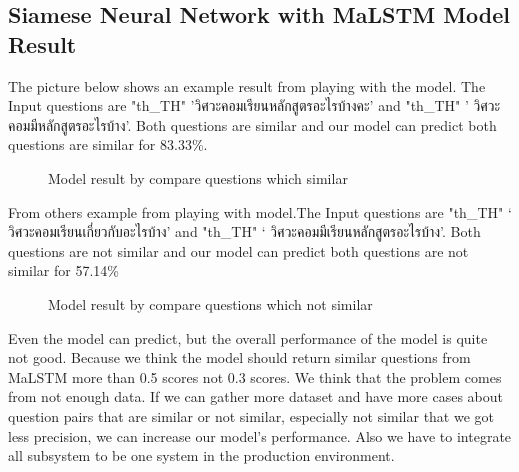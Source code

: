 \documentclass[12pt,oneside,openright,a4paper]{cpe-english-project}
\begin{document}
\subsection{Siamese Neural Network with MaLSTM Model Result}

The picture below shows an example result from playing with the model. The Input questions are
{
\XeTeXlinebreaklocale "th_TH"	
\thaifont 
'วิศวะคอมเรียนหลักสูตรอะไรบ้างคะ' }
and
{
\XeTeXlinebreaklocale "th_TH"	
\thaifont 
 ' วิศวะคอมมีหลักสูตรอะไรบ้าง'. 
}Both questions are similar and our model can predict both questions are similar for 83.33\%.

\begin{figure}[!h]\centering
{}
\caption{Model result by compare questions which similar}\label{fig:Model result by compare questions which similar}
\end{figure}

From others example from playing with model.The Input questions are
{
\XeTeXlinebreaklocale "th_TH"	
\thaifont 
 ‘ วิศวะคอมเรียนเกี่ยวกับอะไรบ้าง’ }and 
{
\XeTeXlinebreaklocale "th_TH"	
\thaifont ‘ วิศวะคอมมีเรียนหลักสูตรอะไรบ้าง’.}
 Both questions are not similar and our model can predict both questions are not similar for 57.14\%

\begin{figure}[!h]\centering
{}
\caption{Model result by compare questions which not similar}\label{fig:Model result by compare questions which not similar}
\end{figure}

Even the model can predict, but the overall performance of the model is quite not good. Because we think the model should return similar questions from MaLSTM more than 0.5 scores not 0.3 scores. We think that the problem comes from not enough data. If we can gather more dataset and have more cases about question pairs that are similar or not similar, especially not similar that we got less precision, we can increase our model's performance. Also we have to integrate all subsystem to be one system in the production environment.
\end{document}
